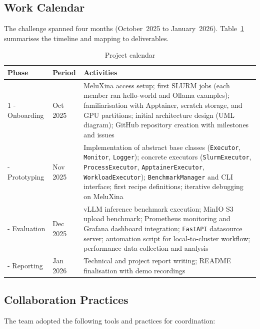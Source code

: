 \documentclass[11pt,a4paper]{article}
\begin{document}
\subsection{Work Calendar}

The challenge spanned four months (October~2025 to January~2026). Table~\ref{tab:calendar} summarises the timeline and mapping to deliverables.

\begin{table}[htbp]
\centering
\caption{Project calendar}
\label{tab:calendar}
\begin{tabularx}{\textwidth}{@{}l l X@{}}
\toprule
\textbf{Phase} & \textbf{Period} & \textbf{Activities} \\
\midrule
1 - Onboarding & Oct 2025 & MeluXina access setup; first SLURM jobs (each member ran hello-world and Ollama examples); familiarisation with Apptainer, scratch storage, and GPU partitions; initial architecture design (UML diagram); GitHub repository creation with milestones and issues \\
\addlinespace
2 - Prototyping & Nov 2025 & Implementation of abstract base classes (\texttt{Executor}, \texttt{Monitor}, \texttt{Logger}); concrete executors (\texttt{SlurmExecutor}, \texttt{ProcessExecutor}, \texttt{ApptainerExecutor}, \texttt{WorkloadExecutor}); \texttt{BenchmarkManager} and CLI interface; first recipe definitions; iterative debugging on MeluXina \\
\addlinespace
3 - Evaluation & Dec 2025 & vLLM inference benchmark execution; MinIO S3 upload benchmark; Prometheus monitoring and Grafana dashboard integration; \texttt{FastAPI} datasource server; automation script for local-to-cluster workflow; performance data collection and analysis \\
\addlinespace
4 - Reporting & Jan 2026 & Technical and project report writing; README finalisation with demo recordings \\
\bottomrule
\end{tabularx}
\end{table}

\subsection{Collaboration Practices}

The team adopted the following tools and practices for coordination:
\end{document}
